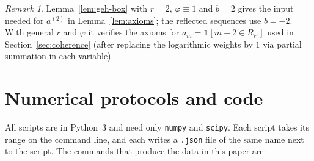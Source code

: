 \documentclass[11pt]{amsart}
\theoremstyle{definition}
\theoremstyle{remark}
\newtheorem{remark}[theorem]{Remark}
\begin{document}
\begin{remark}
Lemma~\ref{lem:geh-box} with $r=2$, $\varphi\equiv1$ and $b=2$ gives the input needed for $a^{(2)}$ in Lemma~\ref{lem:axioms}; the reflected sequences use $b=-2$. With general $r$ and $\varphi$ it verifies the axioms for $a_m=\mathbf 1[m+2\in R_{r'}]$ used in Section~\ref{sec:coherence} (after replacing the logarithmic weights by $1$ via partial summation in each variable).
\end{remark}

\section{Numerical protocols and code}\label{app:code}
All scripts are in Python~3 and need only \texttt{numpy} and \texttt{scipy}. Each script takes its range on the command line, and each writes a \texttt{.json} file of the same name next to the script. The commands that produce the data in this paper are:
\end{document}
